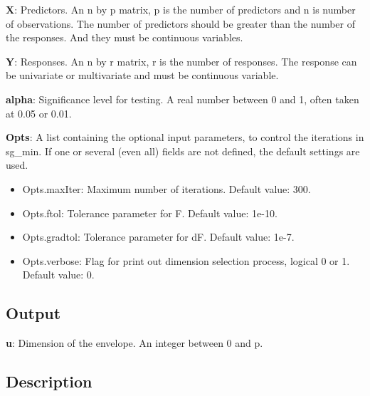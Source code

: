 \documentclass[a4paper,11pt,openany]{memoir}
\begin{document}
\begin{par}
\textbf{X}: Predictors. An n by p matrix, p is the number of predictors and n is number of observations. The number of predictors should be greater than the number of the responses. And they must be continuous variables.
\end{par} \vspace{1em}
\begin{par}
\textbf{Y}: Responses. An n by r matrix, r is the number of responses. The response can be univariate or multivariate and must be continuous variable.
\end{par} \vspace{1em}
\begin{par}
\textbf{alpha}: Significance level for testing.  A real number between 0 and 1, often taken at 0.05 or 0.01.
\end{par} \vspace{1em}
\begin{par}
\textbf{Opts}: A list containing the optional input parameters, to control the iterations in sg\_min. If one or several (even all) fields are not defined, the default settings are used.
\end{par} \vspace{1em}
\begin{itemize}
\setlength{\itemsep}{-1ex}
   \item Opts.maxIter: Maximum number of iterations.  Default value: 300.
   \item Opts.ftol: Tolerance parameter for F.  Default value: 1e-10.
   \item Opts.gradtol: Tolerance parameter for dF.  Default value: 1e-7.
   \item Opts.verbose: Flag for print out dimension selection process, logical 0 or 1. Default value: 0.
\end{itemize}


\subsection*{Output}

\begin{par}
\textbf{u}: Dimension of the envelope. An integer between 0 and p.
\end{par} \vspace{1em}


\subsection*{Description}
\end{document}
